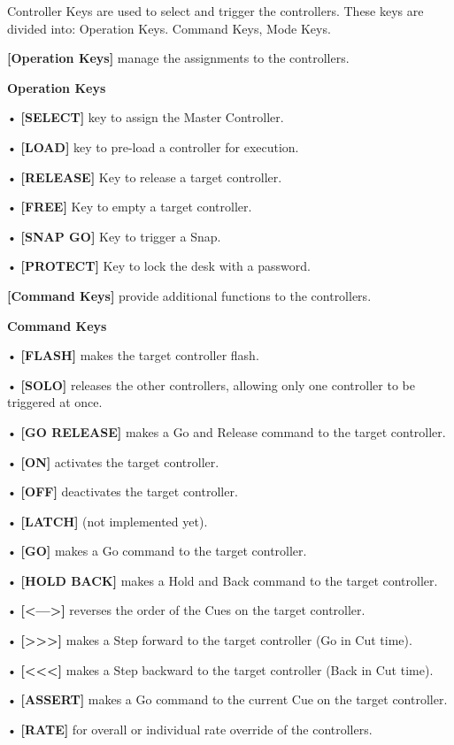 \documentclass[
]{article}
\begin{document}
Controller Keys are used to select and trigger the controllers.
These keys are divided into: Operation Keys. Command Keys, Mode Keys.

\textbf{{[}Operation Keys{]}} manage the assignments to the controllers.

\textbf{Operation Keys}

• \textbf{{[}SELECT{]}} key to assign the Master Controller.

• \textbf{{[}LOAD{]}} key to pre-load a controller for execution.

• \textbf{{[}RELEASE{]}} Key to release a target controller.

• \textbf{{[}FREE{]}} Key to empty a target controller.

• \textbf{{[}SNAP GO{]}} Key to trigger a Snap.

• \textbf{{[}PROTECT{]}} Key to lock the desk with a password.

\textbf{{[}Command Keys{]}} provide additional functions to the controllers.

\textbf{Command Keys}

• \textbf{{[}FLASH{]}} makes the target controller flash.

• \textbf{{[}SOLO{]}} releases the other controllers, allowing only one controller to be triggered at once.

• \textbf{{[}GO RELEASE{]}} makes a Go and Release command to the target controller.

• \textbf{{[}ON{]}} activates the target controller.

• \textbf{{[}OFF{]}} deactivates the target controller.

• \textbf{{[}LATCH{]}} (not implemented yet).

• \textbf{{[}GO{]}} makes a Go command to the target controller.

• \textbf{{[}HOLD BACK{]}} makes a Hold and Back command to the target controller.

• \textbf{{[}\textless---\textgreater{]}} reverses the order of the Cues on the target controller.

• \textbf{{[}\textgreater\textgreater\textgreater{]}} makes a Step forward to the target controller (Go in Cut time).

• \textbf{{[}\textless\textless\textless{]}} makes a Step backward to the target controller (Back in Cut time).

• \textbf{{[}ASSERT{]}} makes a Go command to the current Cue on the target controller.

• \textbf{{[}RATE{]}} for overall or individual rate override of the controllers.
\end{document}
